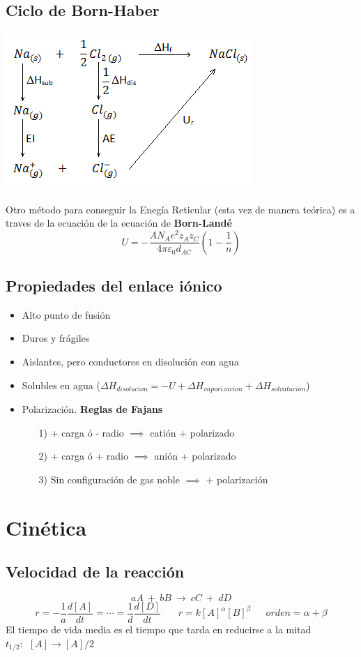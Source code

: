 \documentclass[12pt]{article}
\begin{document}
	\subsection{Ciclo de Born-Haber}
	\includegraphics[scale=0.9]{Born_Haber}
	
	Otro método para conseguir la Enegía Reticular (esta vez de manera teórica) es a traves de la ecuación de la ecuación de \textbf{Born-Landé}
	\[U=-\frac{AN_Ae^2z_Az_C}{4\pi \varepsilon_0 d_{AC}}\left(1-\frac{1}{n}\right)\]
	\subsection{Propiedades del enlace iónico}
	\begin{itemize}
		\item Alto punto de fusión
		\item Duros y frágiles
		\item Aislantes, pero conductores en disolución con agua
		\item Solubles en agua ($\Delta H_{disolucion}=-U+\Delta H_{vaporizacion}+\Delta H_{solvatacion}$)
		\item Polarización. \textbf{Reglas de Fajans}
		\begin{itemize}
			\item[1)] + carga ó - radio $\implies$ catión + polarizado
			\item[2)] + carga ó + radio $\implies$ anión + polarizado
			\item[3)] Sin configuración de gas noble $\implies$ + polarización
		\end{itemize}
	\end{itemize}
	
\section{Cinética}
	\subsection{Velocidad de la reacción}
	\[aA \ + \ bB\ \to \ cC \ + \ dD\]
	\[r=-\frac{1}{a}\frac{d[A]}{dt}=\cdots=\frac{1}{d}\frac{d[D]}{dt} \ \ \ \ \ \ \ \ r=k[A]^\alpha[B]^\beta \ \ \ \ \ \ \ orden = \alpha + \beta\]
	El tiempo de vida media es el tiempo que tarda en reducirse a la mitad $t_{1/2}: \ \ [A]\to [A]/2$\\ 
	\\
\end{document}
